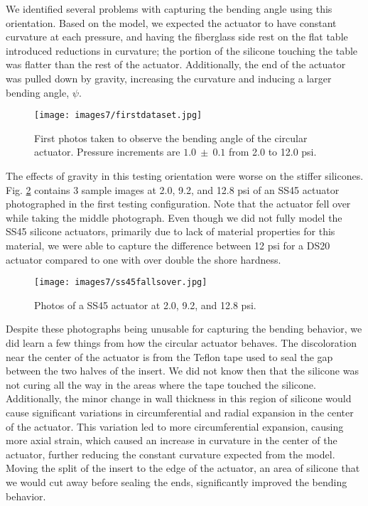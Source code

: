 We identified several problems with capturing the bending angle using this orientation. Based on the model, we expected the actuator to have constant curvature at each pressure, and having the fiberglass side rest on the flat table introduced reductions in curvature; the portion of the silicone touching the table was flatter than the rest of the actuator. Additionally, the end of the actuator was pulled down by gravity, increasing the curvature and inducing a larger bending angle, $\psi$. 

\begin{figure}[ht]
    \centering
     \texttt{[image: images7/firstdataset.jpg]}
    \caption{First photos taken to observe the bending angle of the circular actuator. Pressure increments are $1.0~\pm~0.1$ from 2.0 to 12.0 psi.}
    \label{fig:firstdataset}
\end{figure}

\clearpage

The effects of gravity in this testing orientation were worse on the stiffer silicones. Fig. \ref{fig:ss45fallsover} contains 3 sample images at 2.0, 9.2, and 12.8 psi of an SS45 actuator photographed in the first testing configuration. Note that the actuator fell over while taking the middle photograph. Even though we did not fully model the SS45 silicone actuators, primarily due to lack of material properties for this material, we were able to capture the difference between 12 psi for a DS20 actuator compared to one with over double the shore hardness. 

\begin{figure}[ht]
    \centering
     \texttt{[image: images7/ss45fallsover.jpg]}
    \caption{Photos of a SS45 actuator at 2.0, 9.2, and 12.8 psi.}
    \label{fig:ss45fallsover}
\end{figure}

Despite these photographs being unusable for capturing the bending behavior, we did learn a few things from how the circular actuator behaves. The discoloration near the center of the actuator is from the Teflon tape used to seal the gap between the two halves of the insert. We did not know then that the silicone was not curing all the way in the areas where the tape touched the silicone. Additionally, the minor change in wall thickness in this region of silicone would cause significant variations in circumferential and radial expansion in the center of the actuator. This variation led to more circumferential expansion, causing more axial strain, which caused an increase in curvature in the center of the actuator, further reducing the constant curvature expected from the model. Moving the split of the insert to the edge of the actuator, an area of silicone that we would cut away before sealing the ends, significantly improved the bending behavior. 

